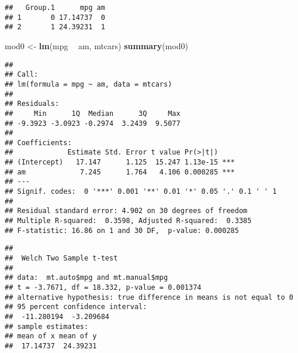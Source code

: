 \documentclass[]{article}
\newenvironment{Shaded}{\begin{snugshade}}{\end{snugshade}}
\newcommand{\KeywordTok}[1]{\textcolor[rgb]{0.13,0.29,0.53}{\textbf{#1}}}
\newcommand{\StringTok}[1]{\textcolor[rgb]{0.31,0.60,0.02}{#1}}
\newcommand{\OperatorTok}[1]{\textcolor[rgb]{0.81,0.36,0.00}{\textbf{#1}}}
\newcommand{\NormalTok}[1]{#1}
\begin{document}
\begin{verbatim}
##   Group.1      mpg am
## 1       0 17.14737  0
## 2       1 24.39231  1
\end{verbatim}

\begin{Shaded}
\begin{Highlighting}[]
\NormalTok{mod0 <-}\StringTok{ }\KeywordTok{lm}\NormalTok{(mpg }\OperatorTok{~}\StringTok{ }\NormalTok{am, mtcars)}
\KeywordTok{summary}\NormalTok{(mod0)}
\end{Highlighting}
\end{Shaded}

\begin{verbatim}
## 
## Call:
## lm(formula = mpg ~ am, data = mtcars)
## 
## Residuals:
##     Min      1Q  Median      3Q     Max 
## -9.3923 -3.0923 -0.2974  3.2439  9.5077 
## 
## Coefficients:
##             Estimate Std. Error t value Pr(>|t|)    
## (Intercept)   17.147      1.125  15.247 1.13e-15 ***
## am             7.245      1.764   4.106 0.000285 ***
## ---
## Signif. codes:  0 '***' 0.001 '**' 0.01 '*' 0.05 '.' 0.1 ' ' 1
## 
## Residual standard error: 4.902 on 30 degrees of freedom
## Multiple R-squared:  0.3598, Adjusted R-squared:  0.3385 
## F-statistic: 16.86 on 1 and 30 DF,  p-value: 0.000285
\end{verbatim}

\begin{Shaded}
\end{Shaded}

\begin{verbatim}
## 
##  Welch Two Sample t-test
## 
## data:  mt.auto$mpg and mt.manual$mpg
## t = -3.7671, df = 18.332, p-value = 0.001374
## alternative hypothesis: true difference in means is not equal to 0
## 95 percent confidence interval:
##  -11.280194  -3.209684
## sample estimates:
## mean of x mean of y 
##  17.14737  24.39231
\end{verbatim}

\begin{Shaded}
\end{Shaded}
\end{document}
